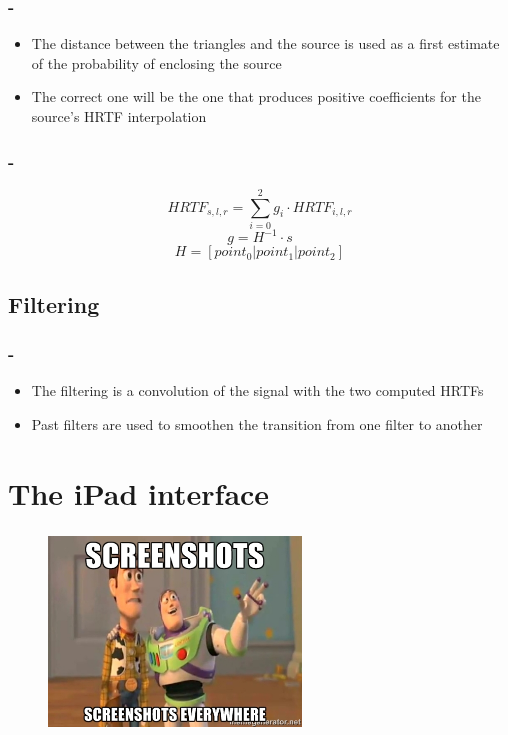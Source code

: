 \documentclass{beamer}
\begin{document}
	\begin{frame}
		\frametitle{\insertsection - \insertsubsection}
		\begin{itemize}
			\item The distance between the triangles and the source is used as a first estimate of the probability of enclosing
				the source
			\item The correct one will be the one that produces positive coefficients for the source's HRTF interpolation
		\end{itemize}
	\end{frame}

	\begin{frame}
		\frametitle{\insertsection - \insertsubsection}
		$$ HRTF_{s,l,r} = \sum\limits_{i=0}^2 g_i \cdot HRTF_{i,l,r} $$
		$$ g = H^{-1} \cdot s $$
		$$ H = [ point_0 | point_1 | point_2 ] $$
	\end{frame}
	
	\subsection{Filtering}

	\begin{frame}
		\frametitle{\insertsection - \insertsubsection}
		\begin{itemize}
			\item The filtering is a convolution of the signal with the two computed HRTFs
			\item Past filters are used to smoothen the transition from one filter to another
		\end{itemize}
	\end{frame}

	\section{The iPad interface}

	\begin{frame}
		\frametitle{\insertsection}
		\begin{figure}
			\centering
			  \includegraphics[width=0.6\textwidth]{images/marine.jpg}
		\end{figure}
	\end{frame}

	\begin{frame}
		\frametitle{\insertsection}
	\end{frame}

	\begin{frame}
		\frametitle{\insertsection}
	\end{frame}
\end{document}
